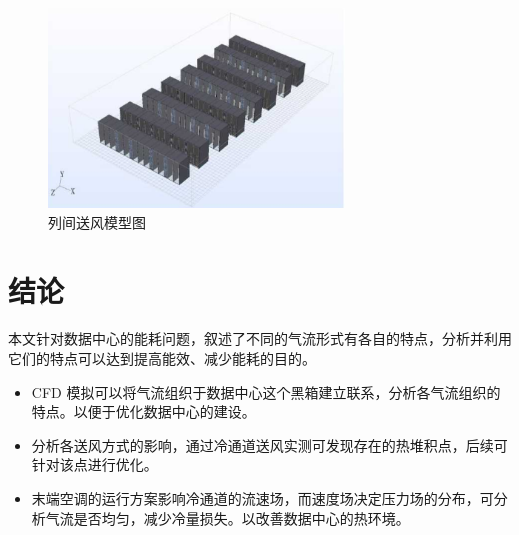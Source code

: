 \begin{figure}[htbp]
	\centering
	\includegraphics[width=0.7\textwidth]{figure/figure_4.png}
	\caption{列间送风模型图}
	\label{F:4}
\end{figure}

\newpage
\section{结论}
本文针对数据中心的能耗问题，叙述了不同的气流形式有各自的特点，分析并利用它们的特点可以达到提高能效、减少能耗的目的。
\begin{itemize}
	\item CFD 模拟可以将气流组织于数据中心这个黑箱建立联系，分析各气流组织的特点。以便于优化数据中心的建设。
	\item 分析各送风方式的影响，通过冷通道送风实测可发现存在的热堆积点，后续可针对该点进行优化。
	\item 末端空调的运行方案影响冷通道的流速场，而速度场决定压力场的分布，可分析气流是否均匀，减少冷量损失。以改善数据中心的热环境。
\end{itemize}

\newpage
\printbibliography


